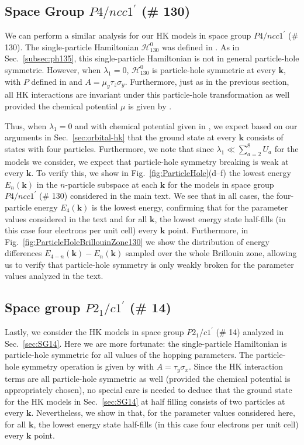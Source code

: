 \documentclass[prb,aps,amssymb,twocolumn,notitlepage]{revtex4-2}
\begin{document}
\subsection{Space Group $P4/ncc1^\prime$ (\# 130)}

We can perform a similar analysis for our HK models in space group $P4/ncc1^\prime$ (\# 130). 
The single-particle Hamiltonian $\mathcal{H}_{130}^{0}$ was defined in . 
As in Sec.~\ref{subsec:ph135}, this single-particle Hamiltonian is not in general particle-hole symmetric. 
However, when $\lambda_1=0$, $\mathcal{H}_{130}^{0}$ is particle-hole symmetric at every $\mathbf{k}$, with $P$ defined in  and $A=\mu_y\tau_z\sigma_y$. 
Furthermore, just as in the previous section, all HK interactions are invariant under this particle-hole transformation as well provided the chemical potential $\mu$ is given by . 

Thus, when $\lambda_1=0$ and with chemical potential given in , we expect based on our arguments in Sec.~\ref{sec:orbital-hk} that the ground state at every $\mathbf{k}$ consists of states with four particles. 
Furthermore, we note that since $\lambda_1 \ll \sum_{a=2}^{8} U_a$ for the models we consider, we expect that particle-hole symmetry breaking is weak at every $\mathbf{k}$. 
To verify this, we show in Fig.~\ref{fig:ParticleHole}(d--f) the lowest energy $E_n(\mathbf{k})$ in the $n$-particle subspace at each $\mathbf{k}$ for the models in space group $P4/ncc1^\prime$ (\# 130) considered in the main text. 
We see that in all cases, the four-particle energy $E_4(\mathbf{k})$ is the lowest energy, confirming that for the parameter values considered in the text and for all $\mathbf{k}$, the lowest energy state half-fills (in this case four electrons per unit cell) every $\mathbf{k}$ point. 
Furthermore, in Fig.~\ref{fig:ParticleHoleBrillouinZone130} we show the distribution of energy differences $E_{4-n}(\mathbf{k})-E_n(\mathbf{k})$ sampled over the whole Brillouin zone, allowing us to verify that particle-hole symmetry is only weakly broken for the parameter values analyzed in the text.


\subsection{Space group $P2_1/c1^\prime$ (\# 14)}
Lastly, we consider the HK models in space group $P2_1/c1^\prime$ (\# 14) analyzed in Sec.~\ref{sec:SG14}. 
Here we are more fortunate: the single-particle Hamiltonian  is particle-hole symmetric for all values of the hopping parameters. 
The particle-hole symmetry operation is given by  with $A=\tau_y\sigma_x$. 
Since the HK interaction terms are all particle-hole symmetric as well (provided the chemical potential is appropriately chosen), no special care is needed to deduce that the ground state for the HK models in Sec.~\ref{sec:SG14} at half filling consists of two particles at every $\mathbf{k}$.
Nevertheless, we show in  that, for the parameter values considered here, for all $\mathbf{k}$, the lowest energy state half-fills (in this case four electrons per unit cell) every $\mathbf{k}$ point.
\end{document}
